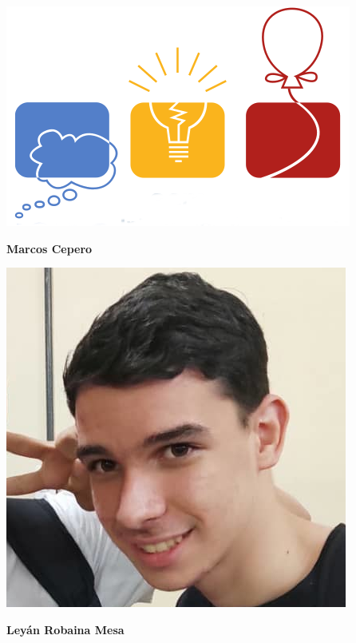 \begin{minipage}{0.2\textwidth}
	\includegraphics[width=\linewidth]{img/icpc.png} %
\end{minipage}
\hfill
\begin{minipage}{0.7\textwidth}
	\textbf{Marcos Cepero}
	
\end{minipage}

\begin{minipage}{0.2\textwidth}
	\includegraphics[width=\linewidth]{img/concursantes/leyan.png} %
\end{minipage}
\hfill
\begin{minipage}{0.7\textwidth}
	\textbf{Leyán Robaina Mesa}
	
\end{minipage}

